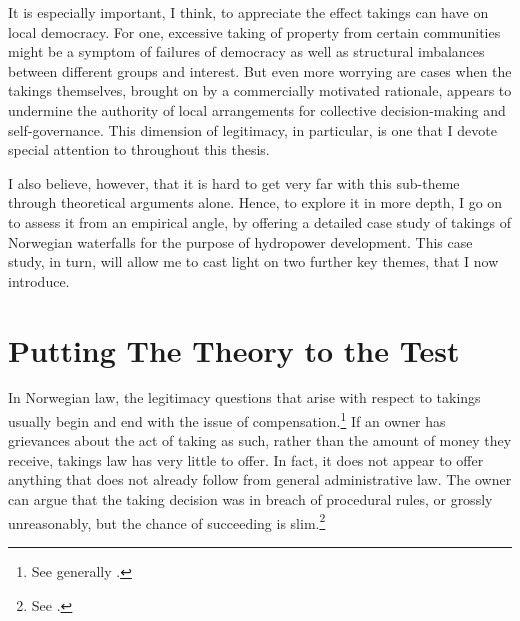 {It is especially important, I think, to appreciate the effect takings can have on local democracy. For one, excessive taking of property from certain communities might be a symptom of failures of democracy as well as structural imbalances between different groups and interest. But even more worrying are cases when the takings themselves, brought on by a commercially motivated rationale, appears to undermine the authority of local arrangements for collective decision-making and self-governance. This dimension of legitimacy, in particular, is one that I devote special attention to throughout this thesis.

I also believe, however, that it is hard to get very far with this sub-theme through theoretical arguments alone. Hence, to explore it in more depth, I go on to assess it from an empirical angle, by offering a detailed case study of takings of Norwegian waterfalls for the purpose of hydropower development. This case study, in turn, will allow me to cast light on two further key themes, that I now introduce. %
}

\section{Putting The Theory to the Test}\label{sec:1:3}

In Norwegian law, the legitimacy questions that arise with respect to takings usually begin and end with the issue of compensation.\footnote{See generally \cite{dyrkolbotn15,dyrkolbotn15a}.} If an owner has grievances about the act of taking as such, rather than the amount of money they receive, takings law has very little to offer. In fact, it does not appear to offer anything that does not already follow from general administrative law. The owner can argue that the taking decision was in breach of procedural rules, or grossly unreasonably, but the chance of succeeding is slim.\footnote{See \cite[384-386]{dyrkolbotn15b}.}


